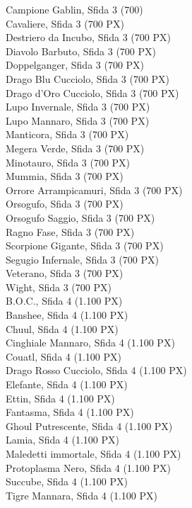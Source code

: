 \begin{multicols}{3}
{Campione Gablin, Sfida 3 (700)\\
Cavaliere, Sfida 3 (700 PX)\\
Destriero da Incubo, Sfida 3 (700 PX)\\
Diavolo Barbuto, Sfida 3 (700 PX)\\
Doppelganger, Sfida 3 (700 PX)\\
Drago Blu Cucciolo, Sfida 3 (700 PX)\\
Drago d'Oro Cucciolo, Sfida 3 (700 PX)\\
Lupo Invernale, Sfida 3 (700 PX)\\
Lupo Mannaro, Sfida 3 (700 PX)\\
Manticora, Sfida 3 (700 PX)\\
Megera Verde, Sfida 3 (700 PX)\\
Minotauro, Sfida 3 (700 PX)\\
Mummia, Sfida 3 (700 PX)\\
Orrore Arrampicamuri, Sfida 3 (700 PX)\\
Orsogufo, Sfida 3 (700 PX)\\
Orsogufo Saggio, Sfida 3 (700 PX)\\
Ragno Fase, Sfida 3 (700 PX)\\
Scorpione Gigante, Sfida 3 (700 PX)\\
Segugio Infernale, Sfida 3 (700 PX)\\
Veterano, Sfida 3 (700 PX)\\
Wight, Sfida 3 (700 PX)\\
B.O.C., Sfida 4 (1.100 PX)\\
Banshee, Sfida 4 (1.100 PX)\\
Chuul, Sfida 4 (1.100 PX)\\
Cinghiale Mannaro, Sfida 4 (1.100 PX)\\
Couatl, Sfida 4 (1.100 PX)\\
Drago Rosso Cucciolo, Sfida 4 (1.100 PX)\\
Elefante, Sfida 4 (1.100 PX)\\
Ettin, Sfida 4 (1.100 PX)\\
Fantasma, Sfida 4 (1.100 PX)\\
Ghoul Putrescente, Sfida 4 (1.100 PX)\\
Lamia, Sfida 4 (1.100 PX)\\
Maledetti immortale, Sfida 4 (1.100 PX)\\
Protoplasma Nero, Sfida 4 (1.100 PX)\\
Succube, Sfida 4 (1.100 PX)\\
Tigre Mannara, Sfida 4 (1.100 PX)\\
}
\end{multicols}

